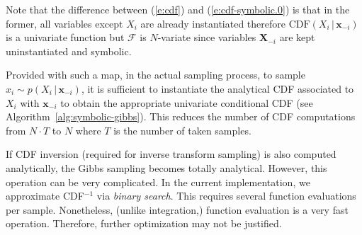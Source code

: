 \documentclass[]{article}
\newcommand{\bvec}[1]{\textbf{#1}}
\newcommand{\pr}{p}
\newcommand{\dd}{\;\mathrm{d}} %
\begin{document}
Note that the difference between (\ref{e:cdf}) and (\ref{e:cdf-symbolic.0}) is that in the former, 
all variables except $X_i$ are already instantiated therefore 
$\text{CDF}(X_i  \,|\, \bvec{x}_{-i})$ is a univariate function but 
$\mathcal{F}$ is $N$-variate since variables $\bvec{X}_{-i}$ are kept uninstantiated and symbolic.

Provided with such a map, in the actual sampling process, 
to sample $x_i \sim \pr(X_i \,|\, \bvec{x}_{-i})$,
it is sufficient to instantiate the analytical CDF associated to $X_i$ with  
$\bvec{x}_{-i}$ to obtain the appropriate univariate conditional CDF
(see Algorithm~\ref{alg:symbolic-gibbs}).
This reduces the number of CDF computations from $N\cdot T$ to $N$ where 
$T$ is the number of taken samples.

If CDF inversion (required for inverse transform sampling)
is also computed analytically, the Gibbs sampling becomes totally analytical.
However, this operation can be very complicated.
In the current implementation, we approximate CDF$^{-1}$ via \emph{binary search}. This requires several function evaluations %
per sample. Nonetheless, (unlike integration,) function evaluation is a very fast operation. Therefore, further optimization may not be justified.    



\end{document}
